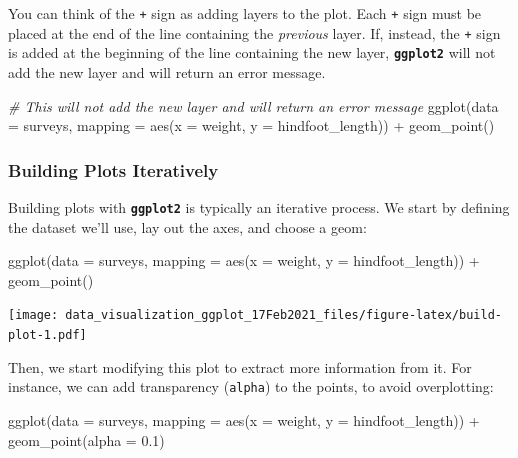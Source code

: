 \documentclass[
]{article}
\newenvironment{Shaded}{\begin{snugshade}}{\end{snugshade}}
\newcommand{\AttributeTok}[1]{\textcolor[rgb]{0.77,0.63,0.00}{#1}}
\newcommand{\CommentTok}[1]{\textcolor[rgb]{0.56,0.35,0.01}{\textit{#1}}}
\newcommand{\FloatTok}[1]{\textcolor[rgb]{0.00,0.00,0.81}{#1}}
\newcommand{\FunctionTok}[1]{\textcolor[rgb]{0.00,0.00,0.00}{#1}}
\newcommand{\NormalTok}[1]{#1}
\newcommand{\SpecialCharTok}[1]{\textcolor[rgb]{0.00,0.00,0.00}{#1}}
\begin{document}
You can think of the \texttt{+} sign as adding layers to the plot. Each
\texttt{+} sign must be placed at the end of the line containing the
\emph{previous} layer. If, instead, the \texttt{+} sign is added at the
beginning of the line containing the new layer,
\textbf{\texttt{ggplot2}} will not add the new layer and will return an
error message.

\begin{Shaded}
\begin{Highlighting}[]
\CommentTok{\# This will not add the new layer and will return an error message}
\FunctionTok{ggplot}\NormalTok{(}\AttributeTok{data =}\NormalTok{ surveys, }
       \AttributeTok{mapping =} \FunctionTok{aes}\NormalTok{(}\AttributeTok{x =}\NormalTok{ weight, }\AttributeTok{y =}\NormalTok{ hindfoot\_length)) }
  \SpecialCharTok{+} \FunctionTok{geom\_point}\NormalTok{()}
\end{Highlighting}
\end{Shaded}

\newpage

\hypertarget{building-plots-iteratively}{%
\subsubsection{Building Plots
Iteratively}\label{building-plots-iteratively}}

Building plots with \textbf{\texttt{ggplot2}} is typically an iterative
process. We start by defining the dataset we'll use, lay out the axes,
and choose a geom:

\begin{Shaded}
\begin{Highlighting}[]
\FunctionTok{ggplot}\NormalTok{(}\AttributeTok{data =}\NormalTok{ surveys, }
       \AttributeTok{mapping =} \FunctionTok{aes}\NormalTok{(}\AttributeTok{x =}\NormalTok{ weight, }\AttributeTok{y =}\NormalTok{ hindfoot\_length)) }\SpecialCharTok{+}
  \FunctionTok{geom\_point}\NormalTok{()}
\end{Highlighting}
\end{Shaded}

\texttt{[image: data\_visualization\_ggplot\_17Feb2021\_files/figure-latex/build-plot-1.pdf]}

Then, we start modifying this plot to extract more information from it.
For instance, we can add transparency (\texttt{alpha}) to the points, to
avoid overplotting:

\begin{Shaded}
\begin{Highlighting}[]
\FunctionTok{ggplot}\NormalTok{(}\AttributeTok{data =}\NormalTok{ surveys, }
       \AttributeTok{mapping =} \FunctionTok{aes}\NormalTok{(}\AttributeTok{x =}\NormalTok{ weight, }\AttributeTok{y =}\NormalTok{ hindfoot\_length)) }\SpecialCharTok{+}
  \FunctionTok{geom\_point}\NormalTok{(}\AttributeTok{alpha =} \FloatTok{0.1}\NormalTok{)}
\end{Highlighting}
\end{Shaded}
\end{document}
